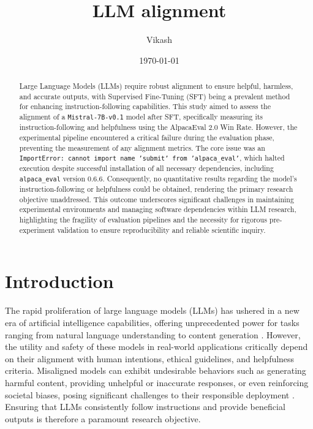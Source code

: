 \documentclass[11pt]{article}
\title{LLM alignment}
\author{Vikash}
\date{\today}
\begin{document}
\maketitle

\begin{abstract}

Large Language Models (LLMs) require robust alignment to ensure helpful, harmless, and accurate outputs, with Supervised Fine-Tuning (SFT) being a prevalent method for enhancing instruction-following capabilities. This study aimed to assess the alignment of a \texttt{{Mistral-7B-v0.1}} model after SFT, specifically measuring its instruction-following and helpfulness using the AlpacaEval 2.0 Win Rate. However, the experimental pipeline encountered a critical failure during the evaluation phase, preventing the measurement of any alignment metrics. The core issue was an \texttt{{ImportError: cannot import name 'submit' from 'alpaca\_eval'}}, which halted execution despite successful installation of all necessary dependencies, including \texttt{{alpaca\_eval}} version 0.6.6. Consequently, no quantitative results regarding the model's instruction-following or helpfulness could be obtained, rendering the primary research objective unaddressed. This outcome underscores significant challenges in maintaining experimental environments and managing software dependencies within LLM research, highlighting the fragility of evaluation pipelines and the necessity for rigorous pre-experiment validation to ensure reproducibility and reliable scientific inquiry.

\end{abstract}

\section{Introduction}

The rapid proliferation of large language models (LLMs) has ushered in a new era of artificial intelligence capabilities, offering unprecedented power for tasks ranging from natural language understanding to content generation \cite{[CITE]}. However, the utility and safety of these models in real-world applications critically depend on their alignment with human intentions, ethical guidelines, and helpfulness criteria. Misaligned models can exhibit undesirable behaviors such as generating harmful content, providing unhelpful or inaccurate responses, or even reinforcing societal biases, posing significant challenges to their responsible deployment \cite{[CITE]}. Ensuring that LLMs consistently follow instructions and provide beneficial outputs is therefore a paramount research objective.
\end{document}
